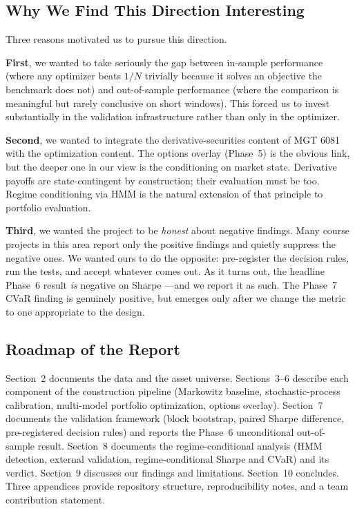 \documentclass[11pt,letterpaper]{article}
\begin{document}
\subsection{Why We Find This Direction Interesting}

Three reasons motivated us to pursue this direction.

\textbf{First}, we wanted to take seriously the gap between in-sample performance (where any optimizer beats $1/N$ trivially because it solves an objective the benchmark does not) and out-of-sample performance (where the comparison is meaningful but rarely conclusive on short windows). This forced us to invest substantially in the validation infrastructure rather than only in the optimizer.

\textbf{Second}, we wanted to integrate the derivative-securities content of MGT 6081 with the optimization content. The options overlay (Phase~5) is the obvious link, but the deeper one in our view is the conditioning on market state. Derivative payoffs are state-contingent by construction; their evaluation must be too. Regime conditioning via HMM is the natural extension of that principle to portfolio evaluation.

\textbf{Third}, we wanted the project to be \emph{honest} about negative findings. Many course projects in this area report only the positive findings and quietly suppress the negative ones. We wanted ours to do the opposite: pre-register the decision rules, run the tests, and accept whatever comes out. As it turns out, the headline Phase~6 result \emph{is} negative on Sharpe —and we report it as such. The Phase~7 CVaR finding is genuinely positive, but emerges only after we change the metric to one appropriate to the design.

\subsection{Roadmap of the Report}

Section~2 documents the data and the asset universe. Sections~3–6 describe each component of the construction pipeline (Markowitz baseline, stochastic-process calibration, multi-model portfolio optimization, options overlay). Section~7 documents the validation framework (block bootstrap, paired Sharpe difference, pre-registered decision rules) and reports the Phase~6 unconditional out-of-sample result. Section~8 documents the regime-conditional analysis (HMM detection, external validation, regime-conditional Sharpe and CVaR) and its verdict. Section~9 discusses our findings and limitations. Section~10 concludes. Three appendices provide repository structure, reproducibility notes, and a team contribution statement.
\end{document}
